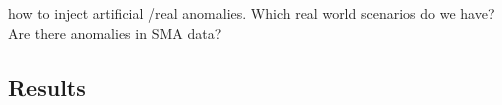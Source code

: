 %
%
%
%
%
%
%
%
%
%
%
%
%
%
%
%
%
how to inject artificial \cite{darban_carla_2024} /real anomalies. Which real world scenarios do we have? Are there anomalies in SMA data?
\subsection{Results}
